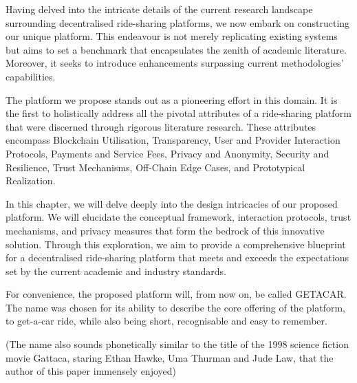 Having delved into the intricate details of the current research landscape surrounding decentralised ride-sharing platforms, we now embark on constructing our unique platform. This endeavour is not merely replicating existing systems but aims to set a benchmark that encapsulates the zenith of academic literature. Moreover, it seeks to introduce enhancements surpassing current methodologies' capabilities.

The platform we propose stands out as a pioneering effort in this domain. It is the first to holistically address all the pivotal attributes of a ride-sharing platform that were discerned through rigorous literature research. These attributes encompass Blockchain Utilisation, Transparency, User and Provider Interaction Protocols, Payments and Service Fees, Privacy and Anonymity, Security and Resilience, Trust Mechanisms, Off-Chain Edge Cases, and Prototypical Realization.

In this chapter, we will delve deeply into the design intricacies of our proposed platform. We will elucidate the conceptual framework, interaction protocols, trust mechanisms, and privacy measures that form the bedrock of this innovative solution. Through this exploration, we aim to provide a comprehensive blueprint for a decentralised ride-sharing platform that meets and exceeds the expectations set by the current academic and industry standards.

For convenience, the proposed platform will, from now on, be called GETACAR. The name was chosen for its ability to describe the core offering of the platform, to get-a-car ride, while also being short, recognisable and easy to remember.

(The name also sounds phonetically similar to the title of the 1998 science fiction movie Gattaca, staring Ethan Hawke, Uma Thurman and Jude Law, that the author of this paper immensely enjoyed)
